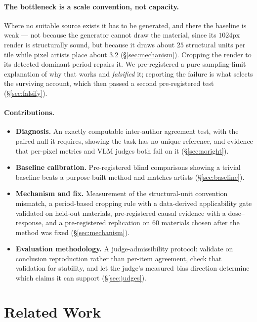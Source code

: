 \documentclass{article}
\begin{document}
\paragraph{The bottleneck is a scale convention, not capacity.} Where no
suitable source exists it has to be generated, and there the baseline is weak
--- not because the generator cannot draw the material, since its $1024$px
render is structurally sound, but because it draws about $25$ structural units
per tile while pixel artists place about $3.2$ (\S\ref{sec:mechanism}).
Cropping the render to its detected dominant period repairs it. We
pre-registered a pure sampling-limit explanation of why that works and
\emph{falsified} it; reporting the failure is what selects the surviving
account, which then passed a second pre-registered test (\S\ref{sec:falsify}).

\paragraph{Contributions.}
\begin{itemize}
\item \textbf{Diagnosis.} An exactly computable inter-author agreement test,
  with the paired null it requires, showing the task has no unique reference,
  and evidence that per-pixel metrics and VLM judges both fail on it
  (\S\ref{sec:noright}).
\item \textbf{Baseline calibration.} Pre-registered blind comparisons showing
  a trivial baseline beats a purpose-built method and matches artists
  (\S\ref{sec:baseline}).
\item \textbf{Mechanism and fix.} Measurement of the structural-unit
  convention mismatch, a period-based cropping rule with a data-derived
  applicability gate validated on held-out materials, pre-registered causal
  evidence with a dose--response, and a pre-registered replication on 60
  materials chosen after the method was fixed (\S\ref{sec:mechanism}).
\item \textbf{Evaluation methodology.} A judge-admissibility protocol:
  validate on conclusion reproduction rather than per-item agreement, check
  that validation for stability, and let the judge's measured bias direction
  determine which claims it can support
  (\S\ref{sec:judges}).
\end{itemize}


\section{Related Work}
\label{sec:related}
\end{document}
